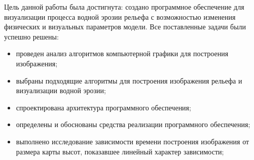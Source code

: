 
Цель данной работы была достигнута: создано программное обеспечение для визуализации процесса водной эрозии
рельефа с возможностью изменения физических и визуальных параметров модели. Все поставленные задачи были успешно решены:

\begin{itemize}
    \item проведен анализ алгоритмов компьютерной графики для построения изображения;
    \item выбраны подходящие алгоритмы для построения изображения рельефа и визуализации водной эрозии;
    \item спроектирована архитектура программного обеспечения;
    \item определены и обоснованы средства реализации программного обеспечения;
    \item выполнено исследование зависимости времени построения изображения от размера карты высот, показавшее линейный характер зависимости;
\end{itemize}








